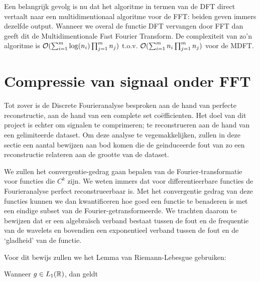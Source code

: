 Een belangrijk gevolg is nu dat het algoritme in termen van de DFT direct vertaalt naar een multidimentionaal algoritme voor de FFT: beiden geven immers dezelfde output. 
Wanneer we overal de functie DFT vervangen door FFT dan geeft dit de Multidimentionale Fast Fourier Transform.
De complexiteit van zo'n algoritme is $\mathcal{O}( \sum_{i=1}^m \log(n_i) \prod_{j=1}^m n_j)$ t.o.v.
$\mathcal{O}( \sum_{i=1}^m n_i \prod_{j=1}^m n_j)$ voor de MDFT.

\section{Compressie van signaal onder FFT}
Tot zover is de Discrete Fourieranalyse besproken aan de hand van perfecte reconstructie, 
aan de hand van een  complete set co\"efficienten. Het doel van dit project is echter om
signalen te comprimeren; te reconstrueren aan de hand van een gelimiteerde dataset.
Om deze analyse te vegemakkelijken, zullen in deze sectie een aantal bewijzen aan bod komen die
de geinduceerde fout van zo een reconstructie relateren aan de grootte van de dataset.

We zullen het convergentie-gedrag gaan bepalen van de Fourier-transformatie voor functies die $C^k$ zijn.
We weten immers dat voor differentieerbare functies de Fourieranalyse perfect reconstrueerbaar is.
Met het convergentie gedrag van deze functies kunnen we dan kwantificeren hoe goed een functie te 
benaderen is met een eindige subset van de Fourier-getransformeerde.
We trachten daarom te bewijzen dat er een algebra\"isch verband bestaat tussen de fout en de frequentie
van de wavelets en bovendien een exponentieel verband tussen de fout en de `gladheid' van de functie.

Voor dit bewijs zullen we het Lemma van Riemann-Lebesgue gebruiken: 
\begin{lemm}
Wanneer $g \in L_1(\mathbb{R})$, dan geldt 
\end{lemm}

